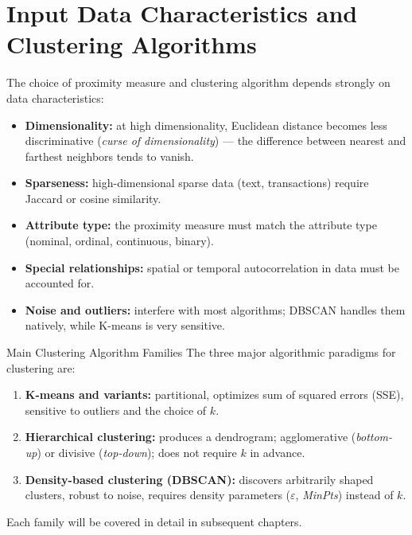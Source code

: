 \section{Input Data Characteristics and Clustering Algorithms}
\label{sec:clustering-input}

The choice of proximity measure and clustering algorithm depends strongly on data characteristics:

\begin{itemize}
  \item \textbf{Dimensionality:} at high dimensionality, Euclidean distance becomes less discriminative (\textit{curse of dimensionality}) — the difference between nearest and farthest neighbors tends to vanish.
  \item \textbf{Sparseness:} high-dimensional sparse data (text, transactions) require Jaccard or cosine similarity.
  \item \textbf{Attribute type:} the proximity measure must match the attribute type (nominal, ordinal, continuous, binary).
  \item \textbf{Special relationships:} spatial or temporal autocorrelation in data must be accounted for.
  \item \textbf{Noise and outliers:} interfere with most algorithms; DBSCAN handles them natively, while K-means is very sensitive.
\end{itemize}

\begin{noteblock}{Main Clustering Algorithm Families}
The three major algorithmic paradigms for clustering are:
\begin{enumerate}
  \item \textbf{K-means and variants:} partitional, optimizes sum of squared errors (SSE), sensitive to outliers and the choice of $k$.
  \item \textbf{Hierarchical clustering:} produces a dendrogram; agglomerative (\textit{bottom-up}) or divisive (\textit{top-down}); does not require $k$ in advance.
  \item \textbf{Density-based clustering (DBSCAN):} discovers arbitrarily shaped clusters, robust to noise, requires density parameters ($\varepsilon$, \textit{MinPts}) instead of $k$.
\end{enumerate}
Each family will be covered in detail in subsequent chapters.
\end{noteblock}

